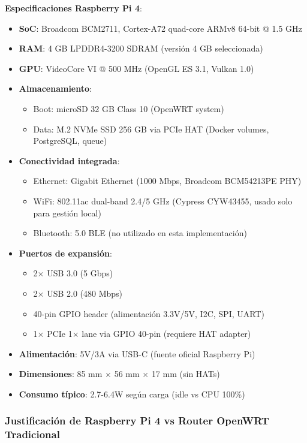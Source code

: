 \textbf{Especificaciones Raspberry Pi 4}:
\begin{itemize}
    \item \textbf{SoC}: Broadcom BCM2711, Cortex-A72 quad-core ARMv8 64-bit @ 1.5 GHz
    \item \textbf{RAM}: 4 GB LPDDR4-3200 SDRAM (versión 4 GB seleccionada)
    \item \textbf{GPU}: VideoCore VI @ 500 MHz (OpenGL ES 3.1, Vulkan 1.0)
    \item \textbf{Almacenamiento}:
    \begin{itemize}
        \item Boot: microSD 32 GB Class 10 (OpenWRT system)
        \item Data: M.2 NVMe SSD 256 GB via PCIe HAT (Docker volumes, PostgreSQL, queue)
    \end{itemize}
    \item \textbf{Conectividad integrada}:
    \begin{itemize}
        \item Ethernet: Gigabit Ethernet (1000 Mbps, Broadcom BCM54213PE PHY)
        \item WiFi: 802.11ac dual-band 2.4/5 GHz (Cypress CYW43455, usado solo para gestión local)
        \item Bluetooth: 5.0 BLE (no utilizado en esta implementación)
    \end{itemize}
    \item \textbf{Puertos de expansión}:
    \begin{itemize}
        \item 2$\times$ USB 3.0 (5 Gbps)
        \item 2$\times$ USB 2.0 (480 Mbps)
        \item 40-pin GPIO header (alimentación 3.3V/5V, I2C, SPI, UART)
        \item 1$\times$ PCIe 1$\times$ lane via GPIO 40-pin (requiere HAT adapter)
    \end{itemize}
    \item \textbf{Alimentación}: 5V/3A via USB-C (fuente oficial Raspberry Pi)
    \item \textbf{Dimensiones}: 85 mm $\times$ 56 mm $\times$ 17 mm (sin HATs)
    \item \textbf{Consumo típico}: 2.7-6.4W según carga (idle vs CPU 100\%)
\end{itemize}

\subsubsection{Justificación de Raspberry Pi 4 vs Router OpenWRT Tradicional}

